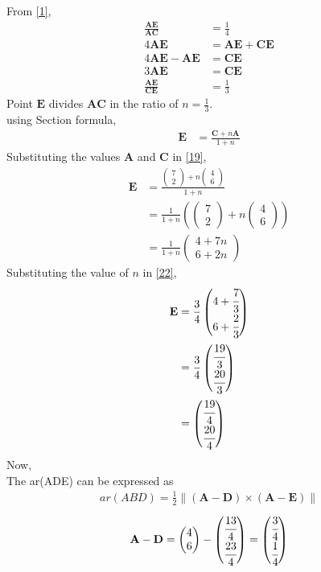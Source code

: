 \documentclass[12pt]{article}
\providecommand{\brak}[1]{\ensuremath{\left(#1\right)}}
\providecommand{\norm}[1]{\left\lVert#1\right\rVert}
\newcommand{\myvec}[1]{\ensuremath{\begin{pmatrix}#1\end{pmatrix}}}
\let\vec\mathbf
\begin{document}
\begin{enumerate}
From \eqref{1},
\begin{align}
\frac{\vec{A}\vec{E}}{\vec{A}\vec{C}} &=\frac{1}{4}\\
4 \vec{A}\vec{E} &=\vec{A}\vec{E} + \vec{C}\vec{E}\\
4 \vec{A}\vec{E}-\vec{A}\vec{E} &=\vec{C}\vec{E}\\
3 \vec{A}\vec{E} &=\vec{C}\vec{E}\\
\frac{\vec{A}\vec{E}}{\vec{C}\vec{E}} &=\frac{1}{3}
\end{align}
Point $\vec{E}$ divides $\vec{A}\vec{C}$ in the ratio of $n = \frac{1}{3}$.\\
using Section formula,
\begin{align}
\vec{E} &=\frac{\vec{C}+n\vec{A}}{1+n}\label{19}
\end{align}
Substituting the values $\vec{A}$ and $\vec{C}$ in \eqref{19},
\begin{align}
\vec{E} &=\frac{{\myvec{7\\2}+n\myvec{4\\6}}}{1+n}\\
          &=\frac{1}{1+n}\brak{{\myvec{7\\2}+n\myvec{4\\6}}} \\
         &=\frac{1}{1+n}\myvec{4+7n\\6+2n} \label{22}
\end{align}
Substituting the value of $n$ in \eqref{22},
\begin{align}
\vec{E} &=\frac{3}{4}\myvec{4+\cfrac{7}{3}\\6+\cfrac{2}{3}}\\
		&=\frac{3}{4}\myvec{\cfrac{19}{3}\\ \cfrac{20}{3}}\\
		&=\myvec{\cfrac{19}{4}\\ \cfrac{20}{4}}
\end{align}
Now,\\
		The ar(ADE) can be expressed as
  \begin{align}
	  ar(ABD)=\frac{1}{2} \norm{\brak{\vec{A}-\vec{D}}  \times 
   \brak{\vec{A}- \vec{E}}} \label{eq:26} 
\end{align}
\begin{align}
	\vec{A}- \vec{D} &= \myvec{4\\6}-\myvec{\cfrac{13}{4}\\ \cfrac{23}{4}\\}=\myvec{\cfrac{3}{4}\\ \cfrac{1}{4}\\}\label{eq:27}\\

\end{align}
\end{enumerate}
\end{document}
